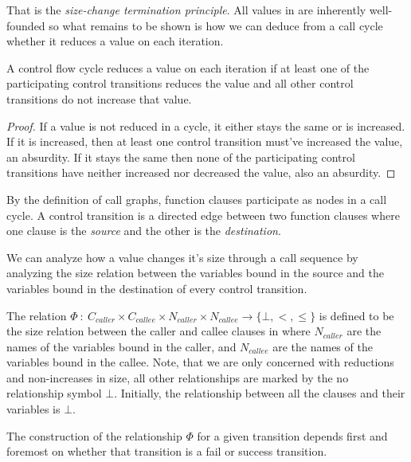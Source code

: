 That is the \emph{size-change termination principle}. All values in \D{} are
inherently well-founded so what remains to be shown is how we can deduce from a
call cycle whether it reduces a value on each iteration.

\begin{lemma}\label{lemma:cycle-reduce} A control flow cycle reduces a value on
each iteration if at least one of the participating control transitions reduces
the value and all other control transitions do not increase that
value.\end{lemma}

\begin{proof} If a value is not reduced in a cycle, it either stays the same or
is increased. If it is increased, then at least one control transition must've
increased the value, an absurdity. If it stays the same then none of the
participating control transitions have neither increased nor decreased the
value, also an absurdity. \end{proof}

By the definition of call graphs, function clauses participate as nodes in a
call cycle. A control transition is a directed edge between two function
clauses where one clause is the \emph{source} and the other is the
\emph{destination}. 

We can analyze how a value changes it's size through a call sequence by
analyzing the size relation between the variables bound in the source and the
variables bound in the destination of every control transition.


\begin{definition} The relation $\Phi\ :\ C_{caller} \times C_{callee} \times
N_{caller} \times N_{callee} \rightarrow \{\bot,<,\leq\}$ is defined to be the
size relation between the caller and callee
clauses in \D{} where $N_{caller}$ are the names of the variables bound in the
caller, and $N_{callee}$ are the names of the variables bound in the callee.
Note, that we are only concerned with reductions and non-increases in size, all
other relationships are marked by the no relationship symbol $\bot$. Initially,
the relationship between all the clauses and their variables is $\bot$.
\end{definition}

The construction of the relationship $\Phi$ for a given transition depends
first and foremost on whether that transition is a fail or success transition.

